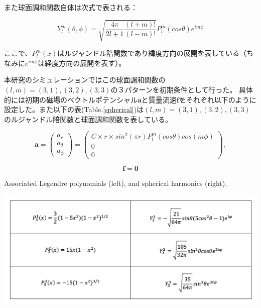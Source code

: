 \documentclass[12pt]{jsarticle}
\begin{document}
また球面調和関数自体は次式で表される：

\begin{equation}
Y_l^m(\theta,\phi) = \sqrt{\frac{4\pi}{2l+1}\frac{(l+m)!}{(l-m)!}}P_l^m (cos\theta)e^{im\phi}
\end{equation}

ここで、$P_l^m (x)$はルジャンドル陪関数であり緯度方向の展開を表している（ちなみに$e^{im\phi}$は経度方向の展開を表す）。

本研究のシミュレーションではこの球面調和関数の$(l,m)=(3,1),(3,2),(3,3)$の３パターンを初期条件として行った。
具体的には初期の磁場のベクトルポテンシャル$\bm a$と質量流速$\bm f$をそれぞれ以下のように設定した。また以下の表(Table.\ref{spherical})は$(l,m)=(3,1),(3,2),(3,3)$のルジャンドル陪関数と球面調和関数を表している。

\begin{equation}
\bm a
=
\begin{pmatrix}
a_r \\ a_\theta \\ a_\phi  
\end{pmatrix} 
=
\begin{pmatrix}
C \times r \times sin^2(\pi r) P_l^m (cos\theta)cos(m\phi) \\ 0 \\ 0 
\end{pmatrix} , 
\end{equation}

\begin{equation}
\bm f = \bm 0
\end{equation}

\begin{table}[H]
\centering
\caption{Associated Legendre polynomials (left), and spherical harmonics (right).} \label{spherical}
\includegraphics[height=1.0\textheight,width=1.0\hsize,angle=0,keepaspectratio]{./Image/spherical_harmonics3.png}
\end{table}
\end{document}
